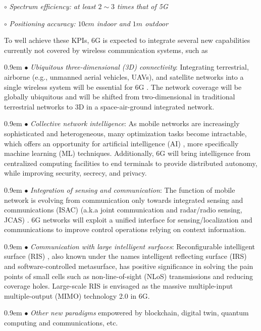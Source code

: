 \documentclass[journal,comsoc]{IEEEtran}
\begin{document}
$\circ$ \emph{Spectrum efficiency: at least $2\sim3$ times that of 5G}

$\circ$ \emph{Positioning accuracy: $10 cm$ indoor and $1 m$ outdoor}


To well achieve these KPIs, 6G is expected to integrate several new capabilities currently not covered by wireless communication systems, such as

\hangindent 0.9em
\noindent
$\bullet$ \emph{Ubiquitous three-dimensional (3D) connectivity}: Integrating terrestrial, airborne (e.g., unmanned aerial vehicles, UAVs), and satellite networks into a single wireless system will be essential for 6G \cite{Space-Air-Ground-Survey-2018}. The network coverage will be globally ubiquitous and will be shifted from two-dimensional in traditional terrestrial networks to 3D in a space-air-ground integrated network.

\hangindent 0.9em
\noindent
$\bullet$ \emph{Collective network intelligence}: As mobile networks are increasingly sophisticated and heterogeneous, many optimization tasks become intractable, which offers an opportunity for artificial intelligence (AI) \cite{Edge-Artificial-Intelligence-6G-2022}, more specifically machine learning (ML) techniques. Additionally, 6G will bring intelligence from centralized computing facilities to end terminals to provide distributed autonomy, while improving security, secrecy, and privacy.


\hangindent 0.9em
\noindent
$\bullet$ \emph{Integration of sensing and communication}: The function of mobile network is evolving from communication only towards integrated sensing and communications (ISAC) (a.k.a joint communication and radar/radio sensing, JCAS) \cite{Integrated-Sensing-Communications-2022}. 6G networks will exploit a unified interface for sensing/localization and communications to improve control operations relying on context information.

\hangindent 0.9em
\noindent
$\bullet$ \emph{Communication with large intelligent surfaces}: Reconfigurable intelligent surface (RIS) \cite{Smart-Radio-Environments-RIS-2020}, also known under the names intelligent reflecting surface (IRS) and software-controlled metasurface, has positive significance in solving the pain points of small cells such as non-line-of-sight (NLoS) transmissions and reducing coverage holes. Large-scale RIS is envisaged as the massive multiple-input multiple-output (MIMO) technology 2.0 in 6G.


\hangindent 0.9em
\noindent
$\bullet$ \emph{Other new paradigms} empowered by blockchain, digital twin, quantum computing and communications, etc.
\end{document}
